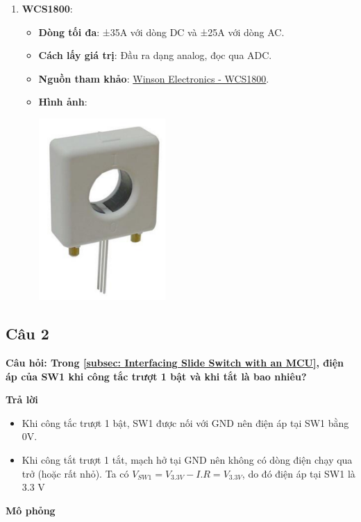 \begin{enumerate}
    \item \textbf{WCS1800}:
    \begin{itemize}
        \item \textbf{Dòng tối đa}: ±35A với dòng DC và ±25A với dòng AC.
        \item \textbf{Cách lấy giá trị}: Đầu ra dạng analog, đọc qua ADC.
        \item \textbf{Nguồn tham khảo}: \href{https://www.winson.com.tw/uploads/images/WCS1800.pdf}{Winson Electronics - WCS1800}.
        \item \textbf{Hình ảnh}:
        \begin{center}
            \includegraphics[width=0.4\textwidth]{graphics/section5/wcs1800.png}
        \end{center}
    \end{itemize}

\end{enumerate}
\pagebreak
\subsection{Câu 2}
\textbf{Câu hỏi: Trong \ref{subsec: Interfacing Slide Switch with an MCU}, điện áp của SW1 khi công tắc trượt 1 bật và khi tắt là bao nhiêu?}

\textbf{Trả lời}
\begin{itemize}
    \item Khi công tắc trượt 1 bật, SW1 được nối với GND nên điện áp tại SW1 bằng 0V.
    \item Khi công tắt trượt 1 tắt, mạch hở tại GND nên không có dòng điện chạy qua trở (hoặc rất nhỏ). Ta có $V_{SW1} = V_{3.3V} - I.R = V_{3.3V}$, do đó điện áp tại SW1 là 3.3 V 
\end{itemize}

\textbf{Mô phỏng}

